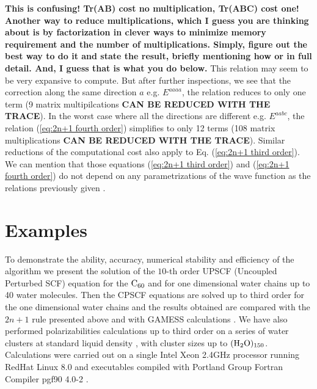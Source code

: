 \documentclass[prl,aps,twocolumn,showpacs,twocolumngrid,superbib]{revtex4}
\def\Tr{{\rm Tr}}
\begin{document}
{\bf This is confusing!  Tr(AB) cost no multiplication, Tr(ABC) cost one!
Another way to reduce multiplications, which I guess you are thinking
about is by factorization in clever ways to minimize memory requirement
and the number of multiplications. Simply, figure out the best way to do it
and state the result, briefly mentioning how or in full detail. And, I guess
that is what you do below.}
This relation may seem to be very expansive to compute. But after further
inspections, we see that the correction along the same direction $a$ e.g. $E^{aaaa}$,
the relation reduces to only one term (9 matrix multipilcations 
{\bf CAN BE REDUCED WITH THE TRACE}).
In the worst case where all the directions are different e.g. $E^{aabc}$, the
relation (\ref{eq:2n+1 fourth order}) simplifies to only 12 
terms (108 matrix multiplications {\bf CAN BE REDUCED WITH THE TRACE}). 
Similar reductions of the computational cost also apply to 
Eq. (\ref{eq:2n+1 third order}).
We can mention that those equations 
(\ref{eq:2n+1 third order}) and (\ref{eq:2n+1 fourth order}) 
do not depend on any parametrizations of the wave function
as the relations previously given \cite{Helgaker_2001,Dupuis_1991}.




\section{Examples}
To demonstrate the ability, accuracy, numerical stability and efficiency 
of the algorithm we present
the solution of the $10$-th order UPSCF (Uncoupled Perturbed SCF) 
equation for the $\rm C_{60}$ and for one dimensional water chains up to
40 water molecules. 
Then the CPSCF equations are solved up to third order for the one dimensional 
water chains and the results obtained are compared with the $2n+1$ rule presented 
above and with GAMESS calculations \cite{gamess}. We have also 
performed polarizabilities
calculations up to third order on a series of water clusters at standard 
liquid density \cite{MChallacombe97,ESchwegler97}, with 
cluster sizes up to $(\rm H_2O)_{150}$. 
Calculations were carried out on a single Intel Xeon 2.4GHz processor 
running RedHat Linux 8.0 and  executables compiled
with Portland Group Fortran Compiler pgf90 4.0-2 \cite{PGF90}.
\end{document}
